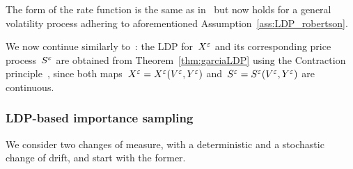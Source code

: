 \begin{remark}
The form of the rate function is the same as in~\cite[Lemma 3.1]{Robertson2010SampleModels} but now holds for a general volatility process adhering to aforementioned Assumption~\ref{ass:LDP_robertson}.
\end{remark}
We now continue similarly to~\cite[Section~3]{Robertson2010SampleModels}:
the LDP for~$X^\varepsilon$ and its corresponding price process~$S^\varepsilon$ are obtained from Theorem~\ref{thm:garciaLDP} using the Contraction principle~\cite[Theorem 4.2.1]{Dembo2010LargeApplications}, 
since both maps~$X^\varepsilon=X^\varepsilon(V^\varepsilon,Y^\varepsilon)$ and~$S^\varepsilon=\nobreak S^\varepsilon(V^\varepsilon,Y^\varepsilon)$ are continuous.


\subsubsection{LDP-based importance sampling}
We consider two changes of measure, with a deterministic and a stochastic change of drift,
and start with the former.\\

